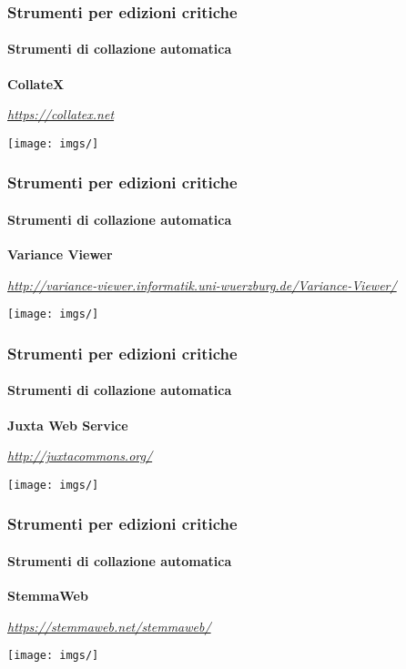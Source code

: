 

\begin{frame}
    \frametitle{Strumenti per edizioni critiche}
    \framesubtitle{Strumenti di collazione automatica}
	\addtocounter{nframe}{1}
    \begin{center}
        \textbf{CollateX}
    \end{center}
    \begin{center}
        \textit{\url{https://collatex.net}}
	\end{center}
    \begin{center}
        \texttt{[image: imgs/]}
	\end{center}
\end{frame}

\begin{frame}
    \frametitle{Strumenti per edizioni critiche}
    \framesubtitle{Strumenti di collazione automatica}
	\addtocounter{nframe}{1}
    \begin{center}
        \textbf{Variance Viewer}
    \end{center}
    \begin{center}
        \textit{\url{http://variance-viewer.informatik.uni-wuerzburg.de/Variance-Viewer/}}
	\end{center}
    \begin{center}
        \texttt{[image: imgs/]}
	\end{center}
\end{frame}

\begin{frame}
    \frametitle{Strumenti per edizioni critiche}
    \framesubtitle{Strumenti di collazione automatica}
	\addtocounter{nframe}{1}
    \begin{center}
        \textbf{Juxta Web Service}
    \end{center}
    \begin{center}
        \textit{\url{http://juxtacommons.org/}}
	\end{center}
    \begin{center}
        \texttt{[image: imgs/]}
	\end{center}
\end{frame}

\begin{frame}
    \frametitle{Strumenti per edizioni critiche}
    \framesubtitle{Strumenti di collazione automatica}
	\addtocounter{nframe}{1}
    \begin{center}
        \textbf{StemmaWeb}
    \end{center}
    \begin{center}
        \textit{\url{https://stemmaweb.net/stemmaweb/}}
	\end{center}
    \begin{center}
        \texttt{[image: imgs/]}
	\end{center}
\end{frame}

